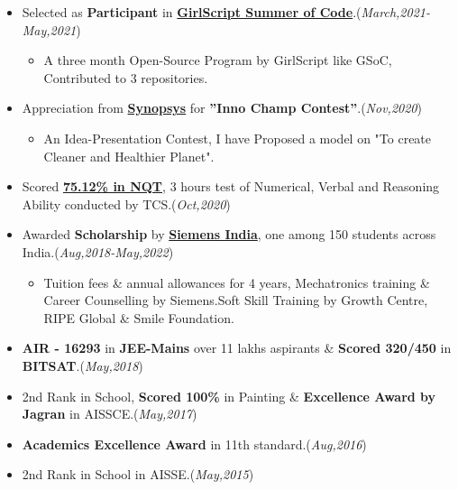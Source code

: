 \documentclass[10pt]{extarticle}
\begin{document}
    \begin{itemize}
       \item Selected as \textbf{Participant} in \href{https://www.linkedin.com/posts/priyanka-soni-131668176_opensource-github-gssoc2021-activity-6768059710504628224-zK4j/}{\color{black}\textbf{GirlScript Summer of Code}}.\hfill\hfill(\textit{March,2021-May,2021})
           \begin{itemize}
               \item A three month Open-Source Program by GirlScript like GSoC, Contributed to 3 repositories.
           \end{itemize}
        \item Appreciation from \href{https://www.linkedin.com/posts/priyanka-soni-131668176_ideapresentationcontest-iot-innovation-activity-6743422132929343488-fRUb/}{\color{black}\textbf{Synopsys}} for \textbf{”Inno Champ Contest”}.\hfill\hfill(\textit{Nov,2020})
          \begin{itemize}
              \item An Idea-Presentation Contest, I have Proposed a model on "To create Cleaner and Healthier Planet".
          \end{itemize}
       \item Scored \href{https://drive.google.com/file/d/1FfOOm94LawOPaGOGxPQHwiO4TyZkc5h6/view}{\color{black}\textbf{75.12\% in NQT}}, 3 hours test of Numerical, Verbal and Reasoning Ability conducted by TCS.\hfill\hfill(\textit{Oct,2020})
       \item Awarded \textbf{Scholarship} by \href{https://drive.google.com/file/d/1XFUYs_kH-7Q7BmaebOLJVNOLyD0d4iTg/view}{\color{black}\textbf{Siemens India}}, one among 150 students across India.\hfill\hfill(\textit{Aug,2018-May,2022})
          \begin{itemize}
            \item Tuition fees \& annual allowances for 4 years, Mechatronics training \& Career Counselling by Siemens.Soft Skill Training by Growth Centre, RIPE Global \& Smile Foundation.
          \end{itemize}
      \item \textbf{AIR - 16293} in \textbf{JEE-Mains} over 11 lakhs aspirants \& \textbf{Scored 320/450} in \textbf{BITSAT}.\hfill\hfill(\textit{May,2018})
      \item 2nd Rank in School, \textbf{Scored 100\%} in Painting \& \textbf{Excellence Award by Jagran} in AISSCE.\hfill\hfill(\textit{May,2017})
      \item \textbf{Academics Excellence Award} in 11th standard.\hfill\hfill(\textit{Aug,2016})
      \item 2nd Rank in School in AISSE.\hfill\hfill(\textit{May,2015})
    \end{itemize}
\end{document}
